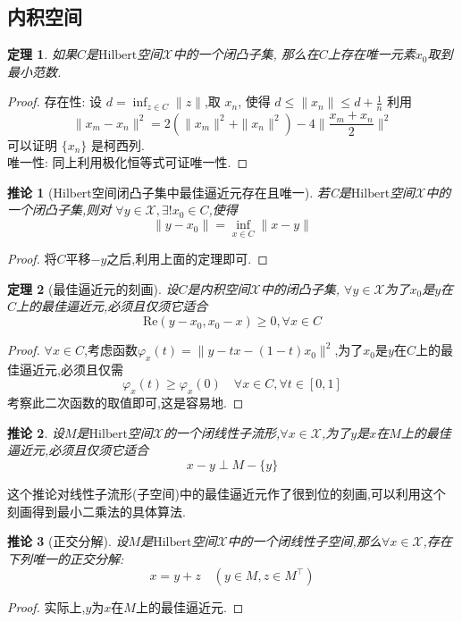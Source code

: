 \documentclass[12pt,a4paper]{article}
\newtheorem{thm}{定理}[subsection]  %
\newtheorem{corollary}{推论}[subsection] %
\begin{document}
\subsection{内积空间}

\begin{thm}
    如果$C$是$\mathrm{Hilbert}$空间$\mathscr{X}$中的一个闭凸子集,
    那么在$C$上存在唯一元素$x_0$取到最小范数.
\end{thm}
\begin{proof}
    存在性: 设 $d= \inf_{z \in C}\|z\|$,取 $x_n$, 使得 $d\leq \|x_n\|\leq d + \frac{1}{n}$ 利用
    \[\|x_m - x_n\|^2 = 2(\|x_m\|^2+\|x_n\|^2)-4\|\frac{x_m + x_n}{2}\|^2\]
    可以证明 $\{x_n\}$ 是柯西列.\\
    唯一性: 同上利用极化恒等式可证唯一性.
\end{proof}
\begin{corollary}[$\mathrm{Hilbert}$空间闭凸子集中最佳逼近元存在且唯一]
    若C是$\mathrm{Hilbert}$空间$\mathscr{X}$中的一个闭凸子集,则对
    $\forall y \in \mathscr{X},\exists !x_0 \in C$,使得\[\|y-x_0\| = \inf_{x\in C}\|x-y\|\]
\end{corollary}
\begin{proof}
    将$C$平移$-y$之后,利用上面的定理即可.
\end{proof}
\begin{thm}[最佳逼近元的刻画]
    设$C$是内积空间$\mathscr{X}$中的闭凸子集, $\forall y \in \mathscr{X}$为了$x_0$是$y$在$C$上的最佳逼近元,必须且仅须它适合
    \[\mathrm{Re}(y-x_0,x_0-x)\geq 0,\forall x \in C\]
\end{thm}
\begin{proof}
    $\forall x \in C$,考虑函数$\varphi_x(t) = \|y-tx-(1-t)x_0\|^2$,为了$x_0$是$y$在$C$上的最佳逼近元,必须且仅需
    \[\varphi_x(t)\geq\varphi_x(0) \quad \forall x \in C ,\forall t \in[0,1]\]
    考察此二次函数的取值即可,这是容易地.
\end{proof}
\begin{corollary}
    设$M$是$\mathrm{Hilbert}$空间$\mathscr{X}$的一个闭线性子流形,$\forall x \in \mathscr{X}$,为了$y$是$x$在$M$上的最佳逼近元,必须且仅须它适合
    \[x-y \perp M-\{y\} \]
\end{corollary}
这个推论对线性子流形(子空间)中的最佳逼近元作了很到位的刻画,可以利用这个刻画得到最小二乘法的具体算法.
\begin{corollary}[正交分解]
    设$M$是$\mathrm{Hilbert}$空间$\mathscr{X}$中的一个闭线性子空间,那么$\forall x \in \mathscr{X}$,存在下列唯一的正交分解:
    \[x= y+z\quad (y\in M,z\in M^{\top})\]
\end{corollary}
\begin{proof}
    实际上,$y$为$x$在$M$上的最佳逼近元.
\end{proof}
\end{document}
